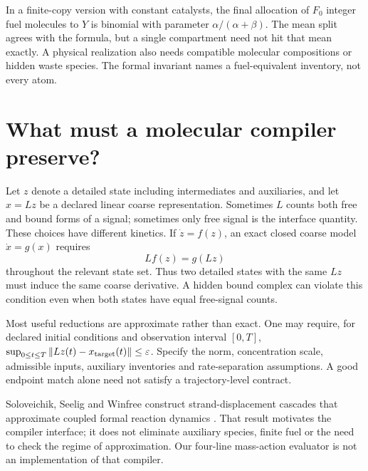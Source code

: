 In a finite-copy version with constant catalysts, the final allocation of
$F_0$ integer fuel molecules to $Y$ is binomial with parameter
$\alpha/(\alpha+\beta)$. The mean split agrees with the formula, but a single
compartment need not hit that mean exactly. A physical realization also
needs compatible molecular compositions or hidden waste species. The
formal invariant names a fuel-equivalent inventory, not every atom.

\section{What must a molecular compiler preserve?}

Let $z$ denote a detailed state including intermediates and auxiliaries,
and let $x=Lz$ be a declared linear coarse representation. Sometimes $L$
counts both free and bound forms of a signal; sometimes only free signal
is the interface quantity. These choices have different kinetics.
If $\dot z=f(z)$, an exact closed coarse model $\dot x=g(x)$ requires
\begin{equation}
 Lf(z)=g(Lz)
 \label{eq:closure}
\end{equation}
throughout the relevant state set. Thus two detailed states with the same
$Lz$ must induce the same coarse derivative. A hidden bound complex can
violate this condition even when both states have equal free-signal counts.


Most useful reductions are approximate rather than exact. One may require,
for declared initial conditions and observation interval $[0,T]$,
$\sup_{0\leq t\leq T}\|Lz(t)-x_{\rm target}(t)\|\leq\varepsilon$.
Specify the norm, concentration scale, admissible inputs, auxiliary inventories
and rate-separation assumptions. A good endpoint match alone need not satisfy
a trajectory-level contract.

Soloveichik, Seelig and Winfree construct strand-displacement cascades that
approximate coupled formal reaction dynamics \cite{soloveichik}. That result
motivates the compiler interface; it does not eliminate auxiliary species,
finite fuel or the need to check the regime of approximation.
Our four-line mass-action evaluator is not an implementation of that compiler.

